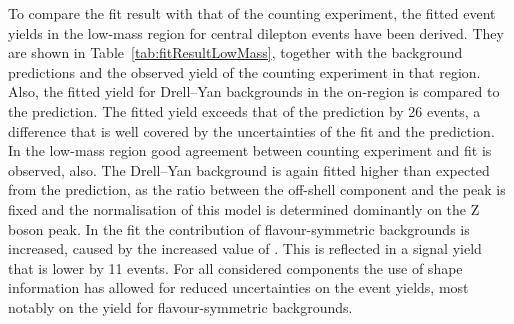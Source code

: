 To compare the fit result with that of the counting experiment, the fitted event yields in the low-mass region for central dilepton events have been derived. They are shown in Table~\ref{tab:fitResultLowMass}, together with the background predictions and the observed yield of the counting experiment in that region. Also, the fitted yield for Drell--Yan backgrounds  in the on-\Z region is compared to the prediction. The fitted yield exceeds that of the prediction by 26 events, a difference that is well covered by the uncertainties of the fit and the prediction. In the low-mass region good agreement between counting experiment and fit is observed, also. The Drell--Yan background is again fitted higher than expected from the prediction, as the ratio between the off-shell component and the peak is fixed and the normalisation of this model is determined dominantly on the Z boson peak. In the fit the contribution of flavour-symmetric backgrounds is increased, caused by the increased value of \Rsfof. This is reflected in a signal yield that is lower by 11 events. For all considered components the use of shape information has allowed for reduced uncertainties on the event yields, most notably on the yield for flavour-symmetric backgrounds. 

